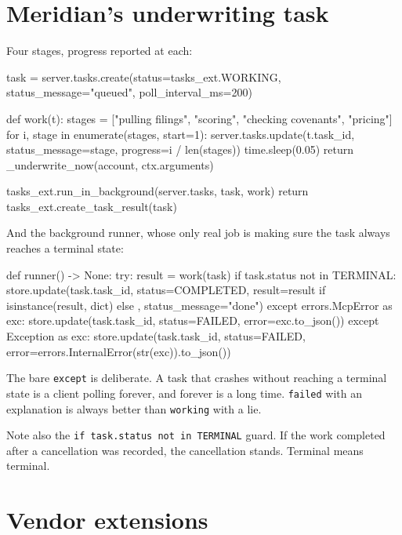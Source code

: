 \section{Meridian's underwriting task}

Four stages, progress reported at each:

\begin{py}
task = server.tasks.create(status=tasks_ext.WORKING,
                           status_message="queued", poll_interval_ms=200)

def work(t):
    stages = ["pulling filings", "scoring", "checking covenants", "pricing"]
    for i, stage in enumerate(stages, start=1):
        server.tasks.update(t.task_id, status_message=stage,
                            progress=i / len(stages))
        time.sleep(0.05)
    return _underwrite_now(account, ctx.arguments)

tasks_ext.run_in_background(server.tasks, task, work)
return tasks_ext.create_task_result(task)
\end{py}

And the background runner, whose only real job is making sure the task always
reaches a terminal state:

\begin{py}
def runner() -> None:
    try:
        result = work(task)
        if task.status not in TERMINAL:
            store.update(task.task_id, status=COMPLETED,
                         result=result if isinstance(result, dict) else {},
                         status_message="done")
    except errors.McpError as exc:
        store.update(task.task_id, status=FAILED, error=exc.to_json())
    except Exception as exc:
        store.update(task.task_id, status=FAILED,
                     error=errors.InternalError(str(exc)).to_json())
\end{py}

The bare \texttt{except} is deliberate. A task that crashes without reaching a
terminal state is a client polling forever, and forever is a long time.
\texttt{failed} with an explanation is always better than \texttt{working} with a
lie.

Note also the \texttt{if task.status not in TERMINAL} guard. If the work
completed after a cancellation was recorded, the cancellation stands. Terminal
means terminal.

\section{Vendor extensions}


